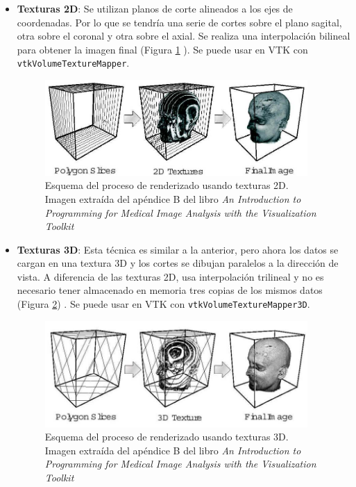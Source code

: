 \begin{itemize}
	\item \textbf{Texturas 2D}: Se utilizan planos de corte alineados a los ejes de coordenadas. Por lo que se tendría una serie de cortes sobre el plano sagital, otra sobre el coronal y otra sobre el axial. Se realiza una interpolación bilineal para obtener la imagen final (Figura \ref{fig:texturas2d} \cite{intro_medical_vtk_bioimage}). Se puede usar en VTK con \texttt{vtkVolumeTextureMapper}.
	\begin{figure}[H]
		\centering
		\includegraphics[width=10cm]{imagenes/texturas2d}
		\caption{Esquema del proceso de renderizado usando texturas 2D. Imagen extraída del apéndice B del libro \textit{An Introduction to Programming for Medical Image Analysis with the Visualization Toolkit }\cite{intro_medical_vtk_bioimage}}
		\label{fig:texturas2d}
	\end{figure}
	
	\item \textbf{Texturas 3D}: Esta técnica es similar a la anterior, pero ahora los datos se cargan en una textura 3D y los cortes se dibujan paralelos a la dirección de vista. A diferencia de las texturas 2D, usa interpolación trilineal y no es necesario tener almacenado en memoria tres copias de los mismos datos (Figura \ref{fig:texturas3d}) \cite{intro_medical_vtk_bioimage}. Se puede usar en VTK con \texttt{vtkVolumeTextureMapper3D}.
	\begin{figure}[H]
		\centering
		\includegraphics[width=10cm]{imagenes/texturas3d}
		\caption{Esquema del proceso de renderizado usando texturas 3D. Imagen extraída del apéndice B del libro \textit{An Introduction to Programming for Medical Image Analysis with the Visualization Toolkit} \cite{intro_medical_vtk_bioimage}}
		\label{fig:texturas3d}
	\end{figure}
	

\end{itemize}

